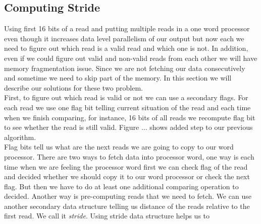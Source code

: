 \subsection{Computing Stride}
Using first 16 bits of a read and putting multiple reads in a one word processor even though it increases data level parallelism of our output but now each we need to figure out which read is a valid read and which one is not. In addition, even if we could figure out valid and non-valid reads from each other we will have memory fragmentation issue. Since we are not fetching our data consecutively and sometime we need to skip part of the memory. In this section we will describe our solutions for these two problem.\\
First, to figure out which read is valid or not we can use a secondary flags. For each read we use one flag bit telling current situation of the read and each time when we finish comparing, for instance, 16 bits of all reads we recompute flag bit to see whether the read is still valid. Figure ... shows added step to our previous algorithm.\\

Flag bits tell us what are the next reads we are going to copy to our word processor. There are two ways to fetch data into processor word, one way is each time when we are feeling the processor word first we can check flag of the read and decided whether we should copy it to our word processor or check the next flag. But then we have to do at least one additional comparing operation to decided. Another way is pre-computing reads that we need to fetch. We can use another secondary data structure telling us distance of the reads relative to the first read. We call it \emph{stride}. Using stride data structure helps us to 

  
  